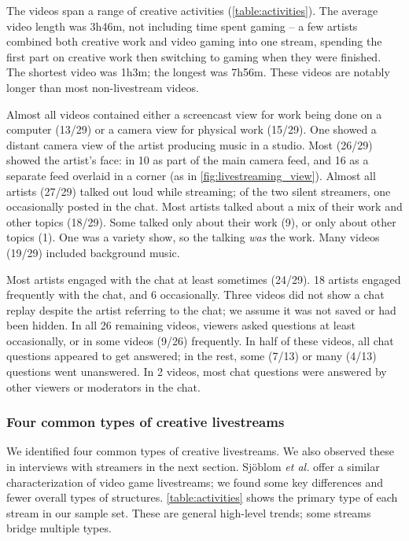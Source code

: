 The videos span a range of creative activities (\autoref{table:activities}). The average video length was 3h46m, not including time spent gaming -- a few artists combined both creative work and video gaming into one stream, spending the first part on creative work then switching to gaming when they were finished. The shortest video was 1h3m; the longest was 7h56m. These videos are notably longer than most non-livestream videos.

Almost all videos contained either a screencast view for work being done on a computer (13/29) or a camera view for physical work (15/29). One showed a distant camera view of the artist producing music in a studio. Most (26/29) showed the artist's face: in 10 as part of the main camera feed, and 16 as a separate feed overlaid in a corner (as in \autoref{fig:livestreaming_view}). Almost all artists (27/29) talked out loud while streaming; of the two silent streamers, one occasionally posted in the chat. Most artists talked about a mix of their work and other topics (18/29). Some talked only about their work (9), or only about other topics (1). One was a variety show, so the talking \textit{was} the work. Many videos (19/29) included background music. 

Most artists engaged with the chat at least sometimes (24/29). 18 artists engaged frequently with the chat, and 6 occasionally. Three videos did not show a chat replay despite the artist referring to the chat; we assume it was not saved or had been hidden. In all 26 remaining videos, viewers asked questions at least occasionally, or in some videos (9/26) frequently. In half of these videos, all chat questions appeared to get answered; in the rest, some (7/13) or many (4/13) questions went unanswered. In 2 videos, most chat questions were answered by other viewers or moderators in the chat.

\subsubsection{Four common types of creative livestreams}
We identified four common types of creative livestreams. We also observed these in interviews with streamers in the next section. Sj{\"{o}}blom \textit{et al.} \cite{Sjoblom2017a} offer a similar characterization of video game livestreams; we found some key differences and fewer overall types of structures. \autoref{table:activities} shows the primary type of each stream in our sample set. These are general high-level trends; some streams bridge multiple types.

